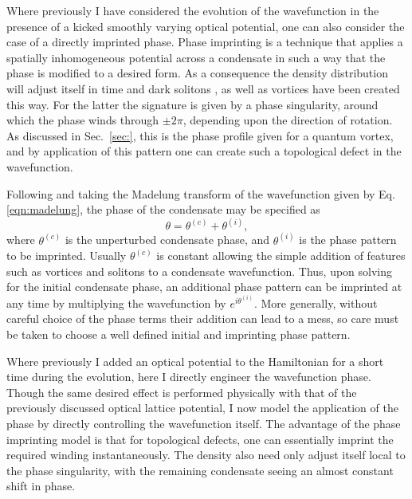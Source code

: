 Where previously I have considered the evolution of the wavefunction in the presence of a kicked smoothly varying optical potential, one can also consider the case of a directly imprinted phase. Phase imprinting is a technique that applies a spatially inhomogeneous potential across a condensate in such a way that the phase is modified to a desired form. As a consequence the density distribution will adjust itself in time and dark solitons \cite{BEC:Denschlag_science_2000}, as well as vortices \cite{Vtx:Dobrek_pra_1999} have been created this way. For the latter the signature is given by a phase singularity, around which the phase winds through $\pm 2\pi$, depending upon the direction of rotation. As discussed in Sec.~\ref{sec:}, this is the phase profile given for a quantum vortex, and by application of this pattern one can create such a topological defect in the wavefunction.

Following \cite{BK:Pitaevskii_Stringari_2003} and taking the Madelung transform of the wavefunction given by Eq. \eqref{eqn:madelung}, the phase of the condensate may be specified as
\begin{equation}
\theta = \theta^{(c)} + \theta^{(i)},
\end{equation}
where $\theta^{(c)}$ is the unperturbed condensate phase, and $\theta^{(i)}$ is the phase pattern to be imprinted. Usually $\theta^{(c)}$ is constant allowing the simple addition of features such as vortices and solitons to a condensate wavefunction. Thus, upon solving for the initial condensate phase, an additional phase pattern can be imprinted at any time by multiplying the wavefunction by $e^{i\theta^{(i)}}$. More generally, without careful choice of the phase terms their addition can lead to a mess, so care must be taken to choose a well defined initial and imprinting phase pattern.

Where previously I added an optical potential to the Hamiltonian for a short time during the evolution, here I directly engineer the wavefunction phase. Though the same desired effect is performed physically with that of the previously discussed optical lattice potential, I now model the application of the phase by directly controlling the wavefunction itself. The advantage of the phase imprinting model is that for topological defects, one can essentially imprint the required winding instantaneously. The density also need only adjust itself local to the phase singularity, with the remaining condensate seeing an almost constant shift in phase.

